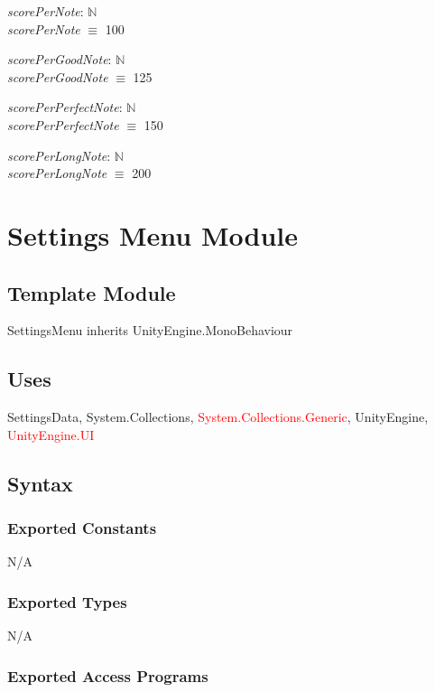 \documentclass[12pt]{article}
\begin{document}
\textit{scorePerNote}: $\mathbb{N} $ \\
\textit{scorePerNote} $\equiv$ 100

\noindent \textit{scorePerGoodNote}: $\mathbb{N} $ \\
\textit{scorePerGoodNote} $\equiv$ 125

\noindent \textit{scorePerPerfectNote}: $\mathbb{N} $ \\
\textit{scorePerPerfectNote} $\equiv$ 150

\noindent \textit{scorePerLongNote}: $\mathbb{N} $ \\
\textit{scorePerLongNote} $\equiv$ 200

\newpage
\section {Settings Menu Module}

\subsection{Template Module} 
SettingsMenu inherits UnityEngine.MonoBehaviour

\subsection {Uses}
SettingsData, System.Collections, \textcolor{red}{System.Collections.Generic}, UnityEngine, \textcolor{red}{UnityEngine.UI}

\subsection {Syntax}

\subsubsection {Exported Constants}
N/A
\subsubsection {Exported Types}
N/A
\subsubsection {Exported Access Programs}
\end{document}
